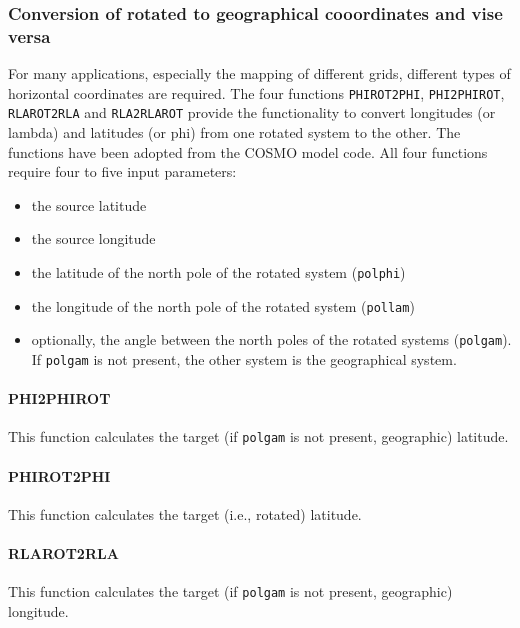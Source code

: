 \documentclass[11pt,twoside]{article}
\begin{document}
\subsubsection{Conversion of rotated to geographical cooordinates and vise versa\label{conv2rot}}
For many applications, especially the mapping of different grids, different
types of horizontal coordinates are required. The four functions 
\verb|PHIROT2PHI|, \verb|PHI2PHIROT|, \verb|RLAROT2RLA|
and \verb|RLA2RLAROT| 
provide the functionality to convert longitudes (or lambda) and latitudes (or
phi) from one rotated system to the other. The functions have been adopted
from the COSMO model code.
All four functions require four to five input parameters:
\begin{itemize}
\item the source latitude
\item the source longitude
\item the latitude of the north pole of the rotated system (\verb|polphi|)
\item the longitude of the north pole of the rotated system (\verb|pollam|)
\item optionally, the angle between the north poles of the rotated
systems (\verb|polgam|). 
If \verb|polgam| is not present, the other system is the geographical
system. 
\end{itemize}
\paragraph{PHI2PHIROT\\\label{P2PR}}
This function calculates the target (if \verb|polgam| is not present,
geographic) latitude.
\paragraph{PHIROT2PHI\\\label{PR2P}}
This function calculates the target (i.e., rotated) latitude.
\paragraph{RLAROT2RLA\\\label{LR2L}}
This function calculates the target (if \verb|polgam| is not present,
geographic) longitude. 
\end{document}
